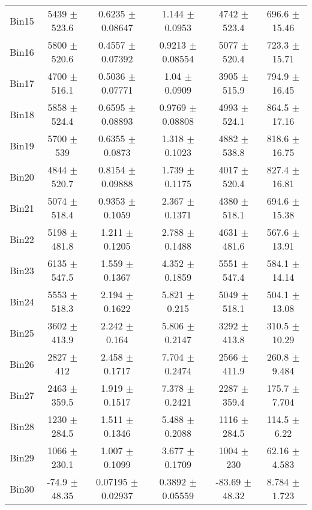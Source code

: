 \begin{tabular}{@{\extracolsep{4pt}}lccccc@{}}
     Bin15 & 5439 $\pm$ 523.6 & 0.6235 $\pm$ 0.08647 & 1.144 $\pm$ 0.0953 & 4742 $\pm$ 523.4 & 696.6 $\pm$ 15.46 \\ 
     Bin16 & 5800 $\pm$ 520.6 & 0.4557 $\pm$ 0.07392 & 0.9213 $\pm$ 0.08554 & 5077 $\pm$ 520.4 & 723.3 $\pm$ 15.71 \\ 
     Bin17 & 4700 $\pm$ 516.1 & 0.5036 $\pm$ 0.07771 & 1.04 $\pm$ 0.0909 & 3905 $\pm$ 515.9 & 794.9 $\pm$ 16.45 \\ 
     Bin18 & 5858 $\pm$ 524.4 & 0.6595 $\pm$ 0.08893 & 0.9769 $\pm$ 0.08808 & 4993 $\pm$ 524.1 & 864.5 $\pm$ 17.16 \\ 
     Bin19 & 5700 $\pm$ 539 & 0.6355 $\pm$ 0.0873 & 1.318 $\pm$ 0.1023 & 4882 $\pm$ 538.8 & 818.6 $\pm$ 16.75 \\ 
     Bin20 & 4844 $\pm$ 520.7 & 0.8154 $\pm$ 0.09888 & 1.739 $\pm$ 0.1175 & 4017 $\pm$ 520.4 & 827.4 $\pm$ 16.81 \\ 
     Bin21 & 5074 $\pm$ 518.4 & 0.9353 $\pm$ 0.1059 & 2.367 $\pm$ 0.1371 & 4380 $\pm$ 518.1 & 694.6 $\pm$ 15.38 \\ 
     Bin22 & 5198 $\pm$ 481.8 & 1.211 $\pm$ 0.1205 & 2.788 $\pm$ 0.1488 & 4631 $\pm$ 481.6 & 567.6 $\pm$ 13.91 \\ 
     Bin23 & 6135 $\pm$ 547.5 & 1.559 $\pm$ 0.1367 & 4.352 $\pm$ 0.1859 & 5551 $\pm$ 547.4 & 584.1 $\pm$ 14.14 \\ 
     Bin24 & 5553 $\pm$ 518.3 & 2.194 $\pm$ 0.1622 & 5.821 $\pm$ 0.215 & 5049 $\pm$ 518.1 & 504.1 $\pm$ 13.08 \\ 
     Bin25 & 3602 $\pm$ 413.9 & 2.242 $\pm$ 0.164 & 5.806 $\pm$ 0.2147 & 3292 $\pm$ 413.8 & 310.5 $\pm$ 10.29 \\ 
     Bin26 & 2827 $\pm$ 412 & 2.458 $\pm$ 0.1717 & 7.704 $\pm$ 0.2474 & 2566 $\pm$ 411.9 & 260.8 $\pm$ 9.484 \\ 
     Bin27 & 2463 $\pm$ 359.5 & 1.919 $\pm$ 0.1517 & 7.378 $\pm$ 0.2421 & 2287 $\pm$ 359.4 & 175.7 $\pm$ 7.704 \\ 
     Bin28 & 1230 $\pm$ 284.5 & 1.511 $\pm$ 0.1346 & 5.488 $\pm$ 0.2088 & 1116 $\pm$ 284.5 & 114.5 $\pm$ 6.22 \\ 
     Bin29 & 1066 $\pm$ 230.1 & 1.007 $\pm$ 0.1099 & 3.677 $\pm$ 0.1709 & 1004 $\pm$ 230 & 62.16 $\pm$ 4.583 \\ 
     Bin30 & -74.9 $\pm$ 48.35 & 0.07195 $\pm$ 0.02937 & 0.3892 $\pm$ 0.05559 & -83.69 $\pm$ 48.32 & 8.784 $\pm$ 1.723 \\ 
\hline\hline
  \end{tabular}
